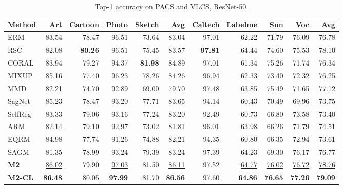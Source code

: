 \documentclass{article}
\begin{document}
\begin{table}[htbp]
\centering
\caption{Top-1 accuracy on PACS and VLCS, ResNet-50.}
\scriptsize
\begin{adjustbox}{max width=\textwidth}
\begin{tabular}{lrrrrrrrrrr}
\toprule
Method & Art & Cartoon & Photo & Sketch & Avg & Caltech & Labelme & Sun & Voc & Avg \\
\midrule
ERM & 83.54 & 78.47 & 96.51 & 73.64 & 83.04 & 97.01 & 62.22 & 71.79 & 76.09 & 76.78 \\
RSC & 82.08 & \textbf{80.26} & 96.51 & 75.45 & 83.57 & \textbf{97.81} & 64.44 & 74.60 & 75.53 & 78.10 \\
CORAL & 83.94 & 79.27 & 94.37 & \textbf{81.98} & 84.89 & 97.01 & 61.34 & 75.26 & 71.74 & 76.34 \\
MIXUP & 85.16 & 77.40 & 96.23 & 78.26 & 84.26 & 96.94 & 62.33 & 73.40 & 72.32 & 76.25 \\
MMD & 82.21 & 74.70 & 92.89 & 69.00 & 79.70 & 97.48 & 63.85 & 75.49 & 71.65 & 77.12 \\
SagNet & 85.23 & 78.47 & 93.20 & 77.71 & 83.65 & 94.14 & 60.43 & 70.49 & 69.96 & 73.75 \\
SelfReg & 83.33 & 79.06 & 93.16 & 77.24 & 83.20 & 92.49 & 60.73 & 66.80 & 73.58 & 73.40 \\
ARM & 82.14 & 79.10 & 92.97 & 73.02 & 81.81 & 96.01 & 63.98 & 66.26 & 71.79 & 74.51 \\
EQRM & 84.98 & 77.74 & 91.26 & 74.88 & 82.21 & 94.35 & 60.80 & 66.35 & 72.94 & 73.61 \\
SAGM & 81.35 & 78.99 & 93.24 & 79.39 & 83.24 & 97.39 & 64.23 & 69.30 & 76.17 & 76.77 \\
\midrule
\textbf{M2} & \underline{86.02} & 79.90 & \underline{97.03} & 81.50 & \underline{86.11} & 97.52 & \underline{64.77} & \underline{76.02} & \underline{76.72} & \underline{78.76} \\
\textbf{M2-CL} & \textbf{86.48} & \underline{80.05} & \textbf{97.99} & \underline{81.70} & \textbf{86.56} & \underline{97.60} & \textbf{64.86} & \textbf{76.65} & \textbf{77.26} & \textbf{79.09} \\
\bottomrule
\end{tabular}
\end{adjustbox}
\end{table}
\end{document}
